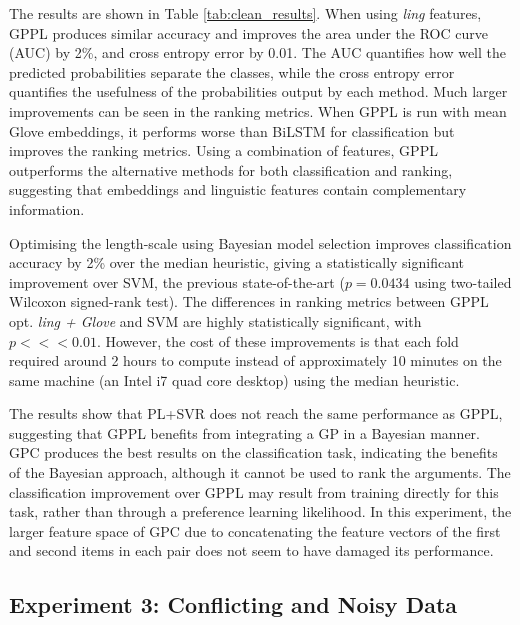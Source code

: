 The results are shown in Table \ref{tab:clean_results}. When using \emph{ling} features,
GPPL produces similar accuracy and improves the area under the ROC curve (AUC) by 2\%,
and cross entropy error by 0.01.
The AUC quantifies how well the predicted probabilities separate the classes,
while the cross entropy error quantifies the usefulness of the probabilities output by each method.
Much larger improvements can be seen in the ranking metrics. 
When GPPL is run with mean Glove embeddings, it performs worse than
BiLSTM for classification but improves the ranking metrics. Using a combination of features,
GPPL outperforms the alternative methods for both classification and ranking, 
suggesting that embeddings and linguistic features contain complementary information.

Optimising the length-scale using Bayesian model selection improves classification accuracy by 2\% over the median heuristic,
giving a statistically significant improvement over SVM, the previous state-of-the-art ($p=0.0434$ using
two-tailed Wilcoxon signed-rank test).
The differences in ranking metrics between GPPL opt. \emph{ling + Glove}
and SVM are highly statistically significant, with $p <<<0.01$.
However, the cost of these improvements is that each fold required around 2 hours to compute instead of approximately 10 minutes on the same machine (an Intel i7 quad core desktop) using the median heuristic. 

The results show that PL+SVR does not reach the same performance as GPPL, 
suggesting that GPPL benefits from  integrating a GP in a Bayesian manner. 
GPC produces the best results on the classification task, 
indicating the benefits of the Bayesian approach, although it cannot be used to rank the arguments.
The classification improvement over GPPL may result from training directly for this task, 
rather than through a preference learning likelihood. In this experiment, the larger feature space of GPC 
due to concatenating the feature vectors of the first and second items in each pair  
does not seem to have damaged its performance.

\subsection{Experiment 3: Conflicting and Noisy Data}

